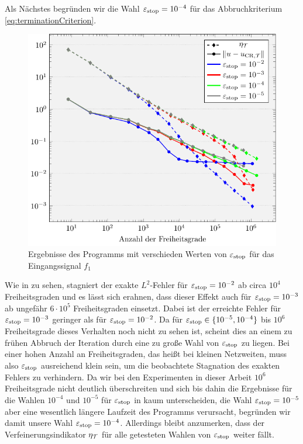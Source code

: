 Als Nächstes begründen wir die Wahl $\varepsilon_{\textup{stop}} = 10^{-4}$ für das
Abbruchkriterium \eqref{eq:terminationCriterion}.
\begin{figure}[p]
  \centering
  \includegraphics[width=.8\linewidth]
    {pictures/chapExperiments/secParameters/parEpsStop/f01/convergenceF.pdf}
  \caption{Ergebnisse des Programms mit verschieden Werten von $\varepsilon_{\textup{stop}}$ für
    das Eingangssignal $f_1$}
  \label{fig:parEpsStopConvergence}
\end{figure}
Wie in  zu sehen, stagniert der exakte
$L^2$-Fehler für $\varepsilon_{\textup{stop}}=10^{-2}$ ab circa $10^4$ Freiheitsgraden und es
lässt sich erahnen, dass dieser Effekt auch für $\varepsilon_{\textup{stop}}=10^{-3}$ ab ungefähr
$6\cdot 10^5$ Freiheitsgraden einsetzt.  
Dabei ist der erreichte Fehler für $\varepsilon_{\textup{stop}}=10^{-3}$ geringer als
für $\varepsilon_{\textup{stop}}=10^{-2}$.
Da für $\varepsilon_{\textup{stop}}\in\{10^{-5},10^{-4}\}$ bis $10^6$ Freiheitsgrade dieses
Verhalten noch nicht zu sehen ist, scheint dies an einem zu frühen Abbruch der
Iteration durch eine zu große Wahl von $\varepsilon_{\textup{stop}}$ zu liegen. 
Bei einer hohen Anzahl an Freiheitsgraden, das heißt bei kleinen Netzweiten,
muss also $\varepsilon_{\textup{stop}}$ ausreichend klein sein, um die beobachtete Stagnation
des exakten Fehlers zu verhindern.
Da wir bei den Experimenten in dieser Arbeit $10^6$ Freiheitsgrade nicht
deutlich überschreiten und sich bis dahin die Ergebnisse für die Wahlen
$10^{-4}$ und $10^{-5}$ für $\varepsilon_{\textup{stop}}$ in  kaum
unterscheiden, die Wahl $\varepsilon_{\textup{stop}}=10^{-5}$ aber eine wesentlich längere
Laufzeit des Programms verursacht, begründen wir damit unsere Wahl
$\varepsilon_{\textup{stop}}=10^{-4}$.
Allerdings bleibt anzumerken, dass der Verfeinerungsindikator $\eta_{\mathcal{T}}$ für alle
getesteten Wahlen von $\varepsilon_{\textup{stop}}$ weiter fällt. 
